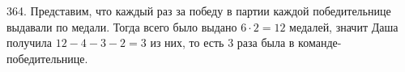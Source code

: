 364. Представим, что каждый раз за победу в партии каждой победительнице выдавали по медали. Тогда всего было выдано $6\cdot2=12$ медалей, значит Даша получила $12-4-3-2=3$ из них, то есть 3 раза была в команде-победительнице.\\
